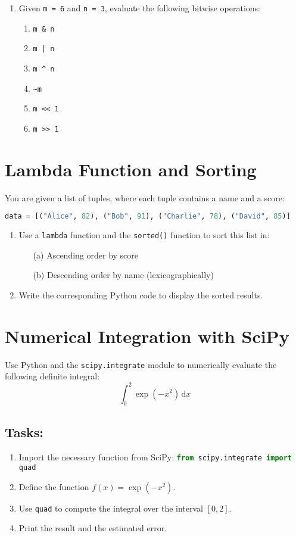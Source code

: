 \documentclass[11pt]{article}
\begin{document}
\begin{enumerate}[label=\arabic*.]
  \item Given \lstinline{m = 6} and \lstinline{n = 3}, evaluate the following bitwise operations:
  \begin{enumerate}[label=(\alph*)]
    \item \lstinline{m & n}
    \item \lstinline{m | n}
    \item \lstinline{m ^ n}
    \item \lstinline{~m}
    \item \lstinline{m << 1}
    \item \lstinline{m >> 1}
  \end{enumerate}
\end{enumerate}



\section*{Lambda Function and Sorting}

You are given a list of tuples, where each tuple contains a name and a score:
\begin{lstlisting}[language=python]
data = [("Alice", 82), ("Bob", 91), ("Charlie", 78), ("David", 85)]
\end{lstlisting}
\begin{enumerate}
\item Use a \texttt{lambda} function and the \texttt{sorted()} function to sort this list in:
\begin{itemize}
    \item[(a)] Ascending order by score
    \item[(b)] Descending order by name (lexicographically)
\end{itemize}
\item Write the corresponding Python code to display the sorted results.
\end{enumerate}




\section*{Numerical Integration with SciPy}

Use Python and the \texttt{scipy.integrate} module to numerically evaluate the following definite integral:
\[
\int_0^2 \exp(-x^2) \, \text{d}x
\]

\subsection*{Tasks:}
\begin{enumerate}
\item Import the necessary function from SciPy: \lstinline[language=python]{from scipy.integrate import quad}
\item Define the function \( f(x) = \exp(-x^2) \).
\item Use \texttt{quad} to compute the integral over the interval \( [0, 2] \).
\item Print the result and the estimated error.
\end{enumerate}
\end{document}
